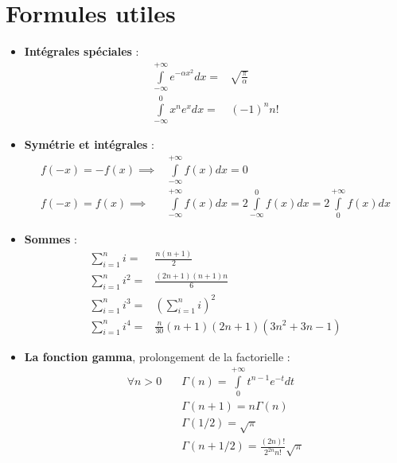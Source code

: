 \documentclass[a4paper,11pt]{report}
\begin{document}
\section{Formules utiles}
\begin{itemize}
\item \textbf{Intégrales spéciales} :
	\begin{align*}
		\int\limits_{-\infty}^{+\infty}{e^{-\alpha x^2}dx}=&
			\sqrt{\frac{\pi}{\alpha}} \\
			\int\limits_{-\infty}^{0}{x^ne^xdx}=&(-1)^nn!
		\end{align*}
\item \textbf{Symétrie et intégrales} :
	\begin{align*}
		f(-x) = -f(x) \implies&
			\int\limits_{-\infty}^{+\infty}{f(x)dx}=0 \\
		f(-x) = f(x) \implies&
			\int\limits_{-\infty}^{+\infty}{f(x)dx} =
			2\int\limits_{-\infty}^{0}{f(x)dx} =
			2\int\limits_{0}^{+\infty}{f(x)dx}
	\end{align*}
\item \textbf{Sommes} :
	\begin{align*}
		\sum\limits_{i=1}^{n}{i} =& \frac{n(n+1)}{2} \\
		\sum\limits_{i=1}^{n}{i^2} =& \frac{(2n+1)(n+1)n}{6} \\
		\sum\limits_{i=1}^{n}{i^3} =& \left(\sum\limits_{i=1}^{n}{i}\right)^2 \\
		\sum\limits_{i=1}^{n}{i^4} =& \frac{n}{30}(n+1)(2n+1)(3n^2+3n-1)
	\end{align*}
\item \textbf{La fonction gamma}, prolongement de la factorielle :
	\begin{align*}
		\forall n>0 \quad&
		\Gamma(n)=\int\limits_{0}^{+\infty}{t^{n-1}e^{-t}dt} \\
		&\Gamma(n+1)=n\Gamma(n) \\
		&\Gamma(1/2)=\sqrt{\pi} \\
		&\Gamma(n+1/2)=\frac{(2n)!}{2^{2n}n!}\sqrt{\pi}
	\end{align*}
\end{itemize}
\end{document}
